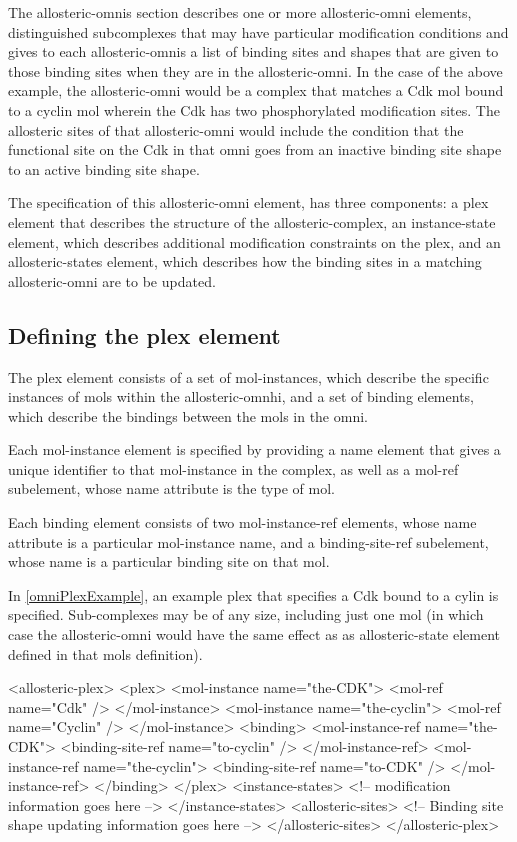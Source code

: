 The allosteric-omnis section describes one or more allosteric-omni
elements, distinguished subcomplexes that may have particular
modification conditions and gives to each allosteric-omnis a list of
binding sites and shapes that are given to those binding sites when
they are in the allosteric-omni.  In the case of the above example,
the allosteric-omni would be a complex that matches a Cdk mol
bound to a cyclin mol wherein the Cdk has two phosphorylated
modification sites.  The allosteric sites of that allosteric-omni
would include the condition that the functional site on the Cdk in
that omni goes from an inactive binding site shape to an active
binding site shape.  

The specification of this allosteric-omni element, has three
components: a plex element that describes the structure of the
allosteric-complex, an instance-state element, which describes
additional modification constraints on the plex, and an
allosteric-states element, which describes how the binding sites in
a matching allosteric-omni are to be updated.

\subsection{Defining the plex element}
The plex element consists of a set of mol-instances, which describe
the specific instances of mols within the allosteric-omnhi, and a set
of binding elements, which describe the bindings between the mols in
the omni.

Each mol-instance element is specified by providing a name element
that gives a unique identifier to that mol-instance in the complex, as
well as a mol-ref subelement, whose name attribute is the type of mol.

Each binding element consists of two mol-instance-ref elements, whose
name attribute is a particular mol-instance name, and a
binding-site-ref subelement, whose name is a particular binding site
on that mol.  

In \ref{omniPlexExample}, an example plex that specifies a Cdk bound
to a cylin is specified.  Sub-complexes may be of any size, including
just one mol (in which case the allosteric-omni would have the same
effect as as allosteric-state element defined in that mols
definition).

\begin{ExampleXML}[caption=An example of how to define a plex section that specifies a cyclin-bound Cdk protein, label=omniPlexExample]
<allosteric-plex>
  <plex>
    <mol-instance name="the-CDK">
      <mol-ref name="Cdk" />
    </mol-instance>
    <mol-instance name="the-cyclin">
      <mol-ref name="Cyclin" />
    </mol-instance>
    <binding>
      <mol-instance-ref name="the-CDK">
	<binding-site-ref name="to-cyclin" />
      </mol-instance-ref>
      <mol-instance-ref name="the-cyclin">
	<binding-site-ref name="to-CDK" />
      </mol-instance-ref>
    </binding>
  </plex>
  <instance-states>
    <!-- modification information goes here -->
  </instance-states>
  <allosteric-sites>
    <!-- Binding site shape updating information goes here -->
  </allosteric-sites>
</allosteric-plex>
\end{ExampleXML}

